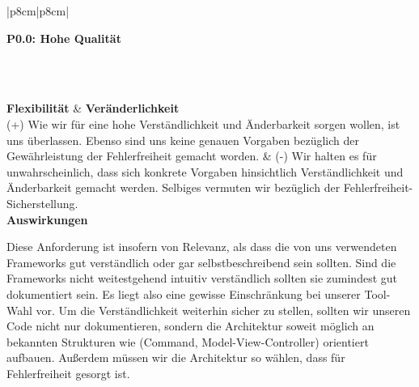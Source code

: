 \documentclass[enabledeprecatedfontcommands,fontsize=11pt,paper=a4,twoside]{scrartcl}
\newcounter{one}
\newcounter{two}[one]
\newcommand{\tone}{0\theone}
\newcommand{\two}{\stepcounter{two}0\thetwo}
\begin{document}
\begin{tabular} {|p{8cm}|p{8cm}|}
	\hline
	 {\parbox{16cm}{\textbf{\hypertarget{h}{P\tone.\two}: Hohe Qualität }} } \\ \hline\hline 
	\rule{0pt}{6ex}\\ [3ex] \hline
	\textbf{Flexibilität}  & \textbf{Veränderlichkeit} \\
	(+) Wie wir für eine hohe Verständlichkeit und Änderbarkeit sorgen wollen, ist uns überlassen. Ebenso sind uns keine genauen Vorgaben bezüglich der Gewährleistung der Fehlerfreiheit gemacht worden. &
	(-) Wir halten es für unwahrscheinlich, dass sich konkrete Vorgaben hinsichtlich Verständlichkeit und Änderbarkeit gemacht werden. Selbiges vermuten wir bezüglich der Fehlerfreiheit-Sicherstellung.   \\
	\hline
	 {\textbf{Auswirkungen}} \\
	 {\parbox{16cm}{Diese Anforderung ist insofern von Relevanz, als dass die von uns verwendeten Frameworks gut verständlich oder gar selbstbeschreibend sein sollten. Sind die Frameworks nicht weitestgehend intuitiv verständlich sollten sie zumindest gut dokumentiert sein. Es liegt also eine gewisse Einschränkung bei unserer Tool-Wahl vor. Um die Verständlichkeit weiterhin sicher zu stellen, sollten wir unseren Code nicht nur dokumentieren, sondern die Architektur soweit möglich an bekannten Strukturen wie (Command, Model-View-Controller) orientiert aufbauen.
			Außerdem müssen wir die Architektur so wählen, dass für Fehlerfreiheit gesorgt ist.} }\\ \hline
\end{tabular}
\end{document}
